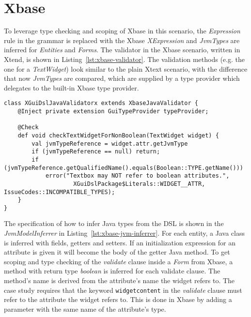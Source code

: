 \section{Xbase}
\label{sec:xbase}

To leverage type checking and scoping of Xbase in this scenario, the
\emph{Expression} rule in the grammar is replaced with the Xbase
\emph{XExpression} and \emph{JvmTypes} are inferred for \emph{Entities} and
\emph{Forms}.
The validator in the Xbase scenario, written in Xtend, is shown in
Listing~\ref{lst:xbase-validator}. The validation methods (e.g. the one for a
\emph{TextWidget}) look similar to the plain Xtext scenario, with the difference
that now \emph{JvmTypes} are compared, which are supplied by a type provider
which delegates to the built-in Xbase type provider.


\begin{lstlisting}[language=xtend,float=tb,label=lst:xbase-validator,caption=Xtext
validator in the Xbase scenario.] 
class XGuiDslJavaValidatorx extends XbaseJavaValidator {
	@Inject private extension GuiTypeProvider typeProvider;

	@Check
	def void checkTextWidgetForNonBoolean(TextWidget widget) {
		val jvmTypeReference = widget.attr.getJvmType
		if (jvmTypeReference == null) return;
		if (jvmTypeReference.getQualifiedName().equals(Boolean::TYPE.getName()))
			error("Textbox may NOT refer to boolean attributes.",
					XGuiDslPackage$Literals::WIDGET__ATTR, IssueCodes::INCOMPATIBLE_TYPES);
	}
}
\end{lstlisting}

The specification of how to infer Java types from the DSL is shown in the
\emph{JvmModelInferrer} in Listing~\ref{lst:xbase-jvm-inferrer}.  For each
entity, a Java class is inferred with fields, getters and setters.
If an initialization expression for an attribute is given it will become the
body of the getter Java method.  To get scoping and type checking of the
\emph{validate} clause inside a \emph{Form} from Xbase, a method with return type \emph{boolean} is inferred for
each validate clause. The method's name is derived from the attribute's name the
widget refers to. The case study requires that the keyword \verb|widgetcontent|
in the \emph{validate} clause must refer to the attribute the widget refers to.
This is done in Xbase by adding a parameter with the same name of the
attribute's type. 

